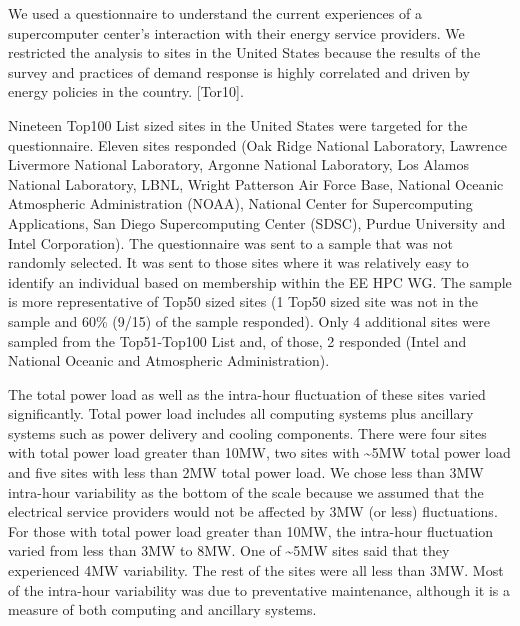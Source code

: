 We used a questionnaire to understand the current experiences of a
supercomputer center's interaction with their energy
service providers. We restricted the analysis to sites in the United States
because the results of the survey and practices of demand response is highly
correlated and driven by energy policies in the country. 
\cite{torriti_demand_2010}
[Tor10].

Nineteen Top100 List sized sites in the United States were targeted for the
questionnaire. Eleven sites responded (Oak Ridge National Laboratory, 
Lawrence Livermore National Laboratory, 
Argonne National Laboratory, 
Los Alamos National Laboratory, LBNL, 
Wright Patterson Air Force Base,
National Oceanic Atmospheric Administration (NOAA), 
National Center for Supercomputing Applications, 
San Diego Supercomputing Center (SDSC), 
Purdue University and Intel Corporation). The questionnaire was
sent to a sample that was not randomly selected. It was sent to those sites
where it was relatively easy to identify an individual based on membership
within the EE HPC WG. The sample is more representative of Top50 sized sites
(1 Top50 sized site was not in the sample and 60{\%} (9/15) of the sample
responded). Only 4 additional sites were sampled from the Top51-Top100 List
and, of those, 2 responded (Intel and National Oceanic and Atmospheric Administration).

The total power load as well as the intra-hour fluctuation of these sites
varied significantly. Total power load includes all computing systems plus 
ancillary systems such as power delivery and cooling components.
There were four sites with total power load greater
than 10MW, two sites with \textasciitilde 5MW total power load and five
sites with less than 2MW total power load. We chose less than 3MW intra-hour
variability as the bottom of the scale because we assumed that the
electrical service providers would not be affected by 3MW (or less) 
fluctuations. For those with total power load greater than 10MW, the
intra-hour fluctuation varied from less than 3MW to 8MW. One of
\textasciitilde 5MW sites said that they experienced 4MW variability. The
rest of the sites were all less than 3MW. Most of the intra-hour variability
was due to preventative maintenance, although it is a measure of both computing and ancillary systems.


